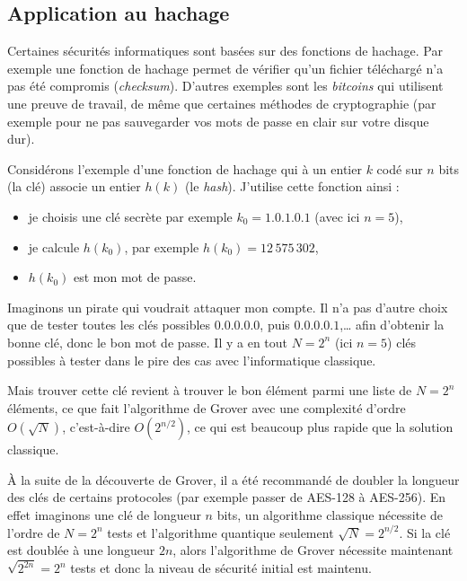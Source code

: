 \documentclass[11pt,class=report,crop=false]{standalone}
\begin{document}
\subsection{Application au hachage}


Certaines sécurités informatiques sont basées sur des fonctions de hachage. Par exemple une fonction de hachage permet de vérifier qu'un fichier téléchargé n'a pas été compromis (\emph{checksum}). D'autres exemples sont les \emph{bitcoins} qui utilisent une \og{}preuve de travail\fg{}, de même que certaines méthodes de cryptographie (par exemple pour ne pas sauvegarder vos mots de passe en clair sur votre disque dur).

Considérons l'exemple d'une fonction de hachage qui à un entier $k$ codé sur $n$ bits (la clé) associe un entier $h(k)$ (le \emph{hash}). 
J'utilise cette fonction ainsi :
\begin{itemize}
  \item je choisis une clé secrète par exemple $k_0 = 1.0.1.0.1$ (avec ici $n=5$),
  \item je calcule $h(k_0)$, par exemple $h(k_0) = 12\,575\,302$,
  \item $h(k_0)$ est mon mot de passe.
\end{itemize}

Imaginons un pirate qui voudrait attaquer mon compte. Il n'a pas d'autre choix que de tester toutes les clés possibles $0.0.0.0.0$, puis $0.0.0.0.1$,\ldots{} 
afin d'obtenir la bonne clé, donc le bon mot de passe.
Il y a en tout $N = 2^n$ (ici $n=5$) clés possibles à tester dans le pire des cas avec l'informatique classique.

Mais trouver cette clé revient à trouver le bon élément parmi une liste de $N=2^n$ éléments, ce que fait l'algorithme de Grover avec une complexité d'ordre
$O(\sqrt{N})$, c'est-à-dire $O(2^{n/2})$, ce qui est beaucoup plus rapide que la solution classique.

\`A la suite de la découverte de Grover, il a été recommandé de doubler la longueur des clés de certains protocoles (par exemple passer de AES-128 à AES-256).
En effet imaginons une clé de longueur $n$ bits, un algorithme classique nécessite de l'ordre de $N=2^n$ tests et l'algorithme quantique seulement $\sqrt{N}=2^{n/2}$.
Si la clé est doublée à une longueur $2n$, alors l'algorithme de Grover nécessite maintenant $\sqrt{2^{2n}}=2^{n}$ tests et donc la niveau de sécurité initial est maintenu.
\end{document}
